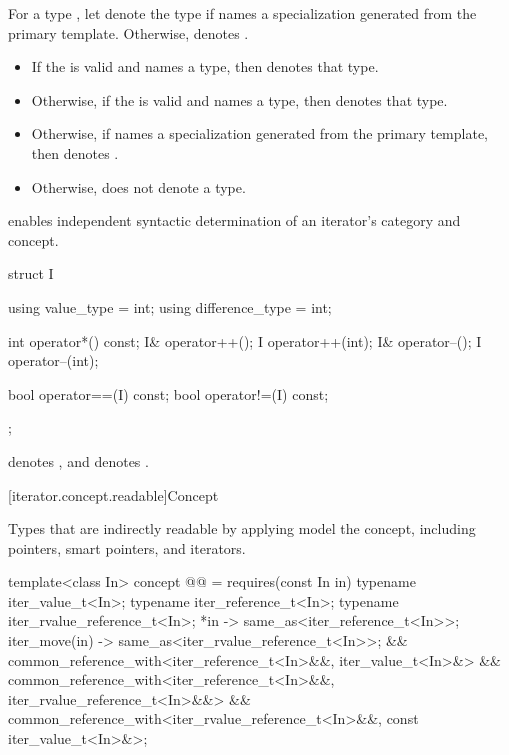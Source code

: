 \pnum
For a type , let  denote
the type  if  names
a specialization generated from the primary template.
Otherwise,  denotes
.
\begin{itemize}
\item If the 
   is valid
  and names a type, then  denotes that
  type.
\item Otherwise, if the 
  is valid and names a type, then 
  denotes that type.
\item Otherwise, if  names a specialization generated
  from the primary template, then 
  denotes .
\item Otherwise,  does not denote a type.
\end{itemize}

\pnum
\begin{note}
 enables independent syntactic determination
of an iterator's category and concept.
\end{note}
\begin{example}
\begin{codeblock}
struct I {
  using value_type = int;
  using difference_type = int;

  int operator*() const;
  I& operator++();
  I operator++(int);
  I& operator--();
  I operator--(int);

  bool operator==(I) const;
  bool operator!=(I) const;
};
\end{codeblock}
 denotes ,
and  denotes .
\end{example}

[iterator.concept.readable]{Concept }

\pnum
Types that are indirectly readable by applying 
model the  concept, including
pointers, smart pointers, and iterators.

\begin{codeblock}
template<class In>
  concept @@ =
    requires(const In in) {
      typename iter_value_t<In>;
      typename iter_reference_t<In>;
      typename iter_rvalue_reference_t<In>;
      { *in } -> same_as<iter_reference_t<In>>;
      { iter_move(in) } -> same_as<iter_rvalue_reference_t<In>>;
    } &&
    common_reference_with<iter_reference_t<In>&&, iter_value_t<In>&> &&
    common_reference_with<iter_reference_t<In>&&, iter_rvalue_reference_t<In>&&> &&
    common_reference_with<iter_rvalue_reference_t<In>&&, const iter_value_t<In>&>;
\end{codeblock}

